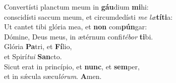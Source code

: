 \evenverse Convertísti planctum meum in \textbf{gáu}dium \textbf{mi}hi:~\*\\
\evenverse conscidísti saccum meum, et circumdedísti \textit{me} \textit{læ}\textbf{tí}\textbf{ti}a:\\
\oddverse Ut cantet tibi glória mea, et \textbf{non} com\textbf{pún}gar:~\*\\
\oddverse Dómine, Deus meus, in ætérnum confi\textit{té}\textit{bor} \textbf{ti}bi.\\
\evenverse Glória \textbf{Pa}tri, et \textbf{Fí}lio,~\*\\
\evenverse et Spirí\textit{tu}\textit{i} \textbf{San}cto.\\
\oddverse Sicut erat in princípio, et \textbf{nunc}, et \textbf{sem}per,~\*\\
\oddverse et in sǽcula sæcu\textit{ló}\textit{rum}. \textbf{A}men.\\
